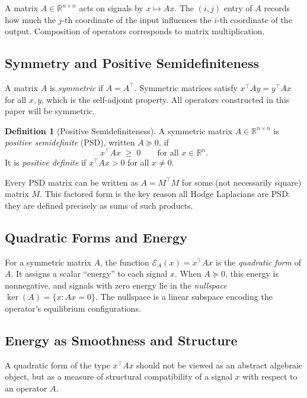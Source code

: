 \documentclass[11pt]{article}
\theoremstyle{definition}
\newtheorem{definition}[theorem]{Definition}
\theoremstyle{remark}
\newcommand{\R}{\mathbb{R}}
\begin{document}
A matrix $A \in \R^{n\times n}$ acts on signals by $x \mapsto Ax$. The $(i,j)$
entry of $A$ records how much the $j$-th coordinate of the input influences the
$i$-th coordinate of the output. Composition of operators corresponds to matrix
multiplication.

\subsection{Symmetry and Positive Semidefiniteness}

A matrix $A$ is \emph{symmetric} if $A = A^\top$. Symmetric matrices satisfy
$x^\top Ay = y^\top Ax$ for all $x,y$, which is the self-adjoint property. All
operators constructed in this paper will be symmetric.

\begin{definition}[Positive Semidefiniteness]
A symmetric matrix $A \in \R^{n\times n}$ is \emph{positive semidefinite}
(PSD), written $A \succeq 0$, if
\[
  x^\top A x \;\geq\; 0 \qquad \text{for all } x \in \R^n.
\]
It is \emph{positive definite} if $x^\top Ax > 0$ for all $x \neq 0$.
\end{definition}

Every PSD matrix can be written as $A = M^\top M$ for some (not necessarily
square) matrix $M$. This factored form is the key reason all Hodge Laplacians
are PSD: they are defined precisely as sums of such products.

\subsection{Quadratic Forms and Energy}

For a symmetric matrix $A$, the function $\mathcal{E}_A(x) = x^\top Ax$ is the
\emph{quadratic form} of $A$. It assigns a scalar ``energy'' to each signal
$x$. When $A \succeq 0$, this energy is nonnegative, and signals with zero
energy lie in the \emph{nullspace} $\ker(A) = \{x : Ax = 0\}$. The nullspace
is a linear subspace encoding the operator's equilibrium configurations.

\subsection{Energy as Smoothness and Structure}

A quadratic form of the type $x^\top A x$ should not be viewed as an abstract algebraic object, but as a measure of structural compatibility of a signal $x$ with respect to an operator $A$.
\end{document}

